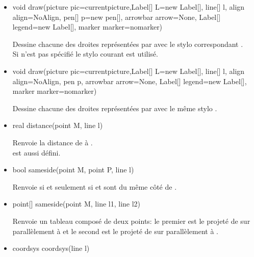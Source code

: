 \documentclass[pdftex]{article}
\newcommand{\ssi}{si et seulement si\xspace}
\begin{document}
\begin{itemize}
\item {}%
    \begin{Vcolor}
    void draw(picture pic=currentpicture,Label[] L=new Label[], line[] l,
    align align=NoAlign, pen[] p=new pen[],
    arrowbar arrow=None,
    Label[] legend=new Label[], marker marker=nomarker)
  \end{Vcolor}
  Dessine chacune des droites représentées par  avec
  le stylo correspondant .\\
  Si  n'est pas spécifié le stylo courant est utilisé.
\item {}%
    \begin{Vcolor}
    void draw(picture pic=currentpicture,Label[] L=new Label[], line[] l,
    align align=NoAlign, pen p,
    arrowbar arrow=None,
    Label[] legend=new Label[], marker marker=nomarker)
  \end{Vcolor}
  Dessine chacune des droites représentées par  avec
  le même stylo .\\
\item {}%
    \begin{Vcolor}
    real distance(point M, line l)
  \end{Vcolor}
  Renvoie la distance de  à .\\
   est aussi défini.
\item {}%
    \begin{Vcolor}
    bool sameside(point M, point P, line l)
  \end{Vcolor}
  Renvoie  \ssi {} et  sont du même côté
  de .
\item {}%
    \begin{Vcolor}
    point[] sameside(point M, line l1, line l2)
  \end{Vcolor}
  Renvoie un tableau composé de deux points: le premier est le projeté
  de  sur  parallèlement à  et le second est
  le projeté de  sur  parallèlement à .
\item {}%
    \begin{Vcolor}
    coordsys coordsys(line l)
  \end{Vcolor}

\end{itemize}
\end{document}
